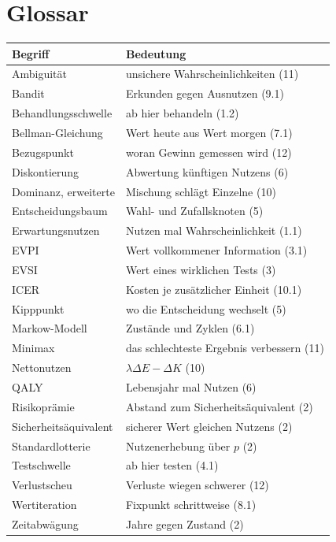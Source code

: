 \section{Glossar}

\begin{merksatz}
\begin{center}
{\small
\renewcommand{\arraystretch}{1.3}
\begin{longtable}{@{}P{3.6cm}P{5.0cm}@{}}
\toprule
\textbf{Begriff} & \textbf{Bedeutung}\\
\midrule
\endhead
Ambiguität & unsichere Wahrscheinlichkeiten (11)\\
Bandit & Erkunden gegen Ausnutzen (9.1)\\
Behandlungsschwelle & ab hier behandeln (1.2)\\
Bellman-Gleichung & Wert heute aus Wert morgen (7.1)\\
Bezugspunkt & woran Gewinn gemessen wird (12)\\
Diskontierung & Abwertung künftigen Nutzens (6)\\
Dominanz, erweiterte & Mischung schlägt Einzelne (10)\\
Entscheidungsbaum & Wahl- und Zufallsknoten (5)\\
Erwartungsnutzen & Nutzen mal Wahrscheinlichkeit (1.1)\\
EVPI & Wert vollkommener Information (3.1)\\
EVSI & Wert eines wirklichen Tests (3)\\
ICER & Kosten je zusätzlicher Einheit (10.1)\\
Kipppunkt & wo die Entscheidung wechselt (5)\\
Markow-Modell & Zustände und Zyklen (6.1)\\
Minimax & das schlechteste Ergebnis verbessern (11)\\
Nettonutzen & $\lambda\Delta E - \Delta K$ (10)\\
QALY & Lebensjahr mal Nutzen (6)\\
Risikoprämie & Abstand zum Sicherheitsäquivalent (2)\\
Sicherheitsäquivalent & sicherer Wert gleichen Nutzens (2)\\
Standardlotterie & Nutzenerhebung über $p$ (2)\\
Testschwelle & ab hier testen (4.1)\\
Verlustscheu & Verluste wiegen schwerer (12)\\
Wertiteration & Fixpunkt schrittweise (8.1)\\
Zeitabwägung & Jahre gegen Zustand (2)\\
\bottomrule
\end{longtable}}
\end{center}
\end{merksatz}
